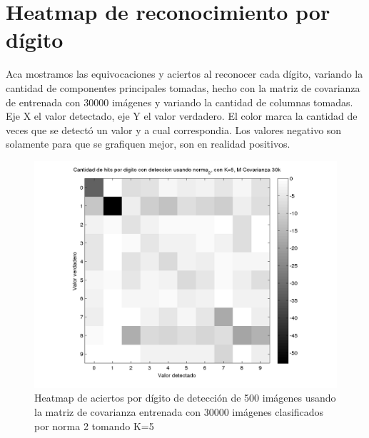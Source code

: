 \section{Heatmap de reconocimiento por d\'igito}
Aca mostramos las equivocaciones y aciertos al reconocer cada d\'igito, variando la cantidad de componentes principales tomadas, hecho con la matriz de covarianza de
entrenada con 30000 im\'agenes y variando la cantidad de columnas tomadas. Eje X el valor detectado, eje Y el valor verdadero. El color marca la cantidad
de veces que se detect\'o un valor y a cual correspondia. Los valores negativo son solamente para que se grafiquen mejor,
son en realidad positivos.

\def \hmwidth {500pt}
\begin{figure}[H]
\includegraphics[width=\hmwidth]{plots/heatmap-30kcv-k5-norma_2.png}
\caption{Heatmap de aciertos por d\'igito de detecci\'on de 500 im\'agenes usando la matriz de covarianza entrenada con 30000 im\'agenes
clasificados por norma 2 tomando K=5}
\label{fig:HM30kcv-k5}
\end{figure}

